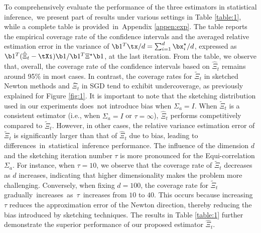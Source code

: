 To comprehensively evaluate the performance of the three estimators in statistical inference,~we present part of results under various settings in Table \ref{table:1}, while a complete table is provided~in~Appendix \ref{appen:exp}. The table reports the empirical coverage rate of the confidence intervals and the averaged relative estimation error in the variance of $\b1^T\tx/d = \sum_{i=1}^d \bx^\star_i/d$, expressed as $\b1^T(\hat{\Xi}_t - \tXi)\b1/\b1^T\Xi^\star\b1$, at the last iteration.
From the table, we observe that, overall, the coverage rate of the confidence intervals based on $\hat{\Xi}_t$ remains around 95\% in most cases. In contrast, the coverage rates for $\tilde{\Xi}_t$ in sketched Newton methods and $\bar{\Xi}_t$ in SGD tend to exhibit undercoverage, as previously explained for Figure \ref{fig:1}. 
It is important to note that the sketching distribution used in our experiments does~not introduce bias when $\Sigma_a = I$. When $\tilde{\Xi}_t$ is a consistent estimator (i.e., when $\Sigma_a = I$ or $\tau = \infty$), $\hat{\Xi}_t$ performs competitively compared to $\tilde{\Xi}_t$. However, in other cases, the relative variance estimation error of $\tilde{\Xi}_t$ is significantly larger than that of $\hat{\Xi}_t$ due to bias, leading to differences~in~statistical~inference performance.
The influence of the dimension $d$ and the sketching iteration number $\tau$ is more pronounced for the Equi-correlation $\Sigma_a$. 
For instance, when $\tau = 10$, we observe that the coverage rate of $\tilde{\Xi}_t$ decreases as $d$ increases, indicating that higher dimensionality makes the problem more challenging. Conversely, when fixing $d = 100$, the coverage rate for $\tilde{\Xi}_t$ gradually~increases~as~$\tau$~increases from $10$ to $40$. This occurs because increasing $\tau$ reduces the approximation error of the Newton direction, thereby reducing the bias introduced by sketching techniques. 
The results in Table \ref{table:1} further demonstrate the superior performance of our proposed estimator $\hat{\Xi}_t$.



